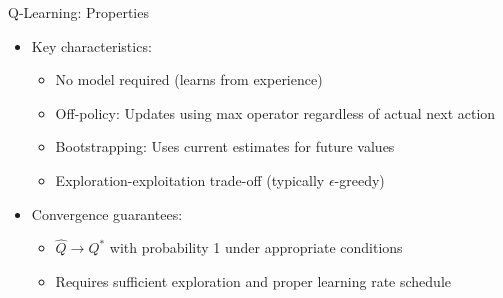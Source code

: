 \documentclass[10pt]{beamer}
\begin{document}
\begin{frame}{Q-Learning: Properties}
    \begin{itemize}
        \item Key characteristics:
        \begin{itemize}
            \item No model required (learns from experience)
            \item Off-policy: Updates using max operator regardless of actual next action
            \item Bootstrapping: Uses current estimates for future values
            \item Exploration-exploitation trade-off (typically $\epsilon$-greedy)
        \end{itemize}
        \vspace{0.2cm}
        \item Convergence guarantees:
        \begin{itemize}
            \item $\hat{Q} \to Q^*$ with probability 1 under appropriate conditions
            \item Requires sufficient exploration and proper learning rate schedule
        \end{itemize}
        \vspace{0.2cm}
    \end{itemize}
\end{frame}

\end{document}
